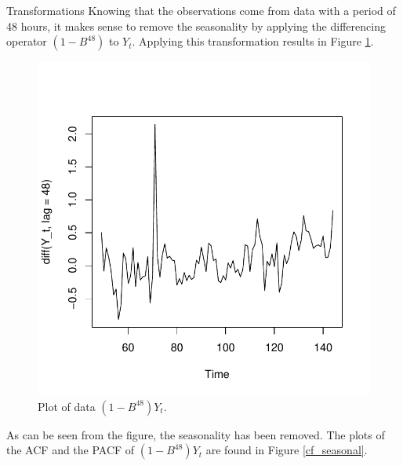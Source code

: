 \begin{subsection}{Transformations}
  Knowing that the observations come from data with a period of 48 hours, it makes sense
  to remove the seasonality by applying the differencing operator $\left(1 - B^{48}\right)$ to $Y_t$.
  Applying this transformation results in Figure \ref{seasonal_plot}.

  \begin{figure}[!h]
    \centerline{\includegraphics[scale=0.75]{../analysis/plots/seasonal_plot}}
    \caption{Plot of data $\left(1 - B^{48}\right)Y_t$.}\label{seasonal_plot}
  \end{figure}

  As can be seen from the figure, the seasonality has been removed. The plots
  of the ACF and the PACF of $\left(1 - B^{48}\right)Y_t$ are found in Figure \ref{cf_seasonal}.


\end{subsection}
